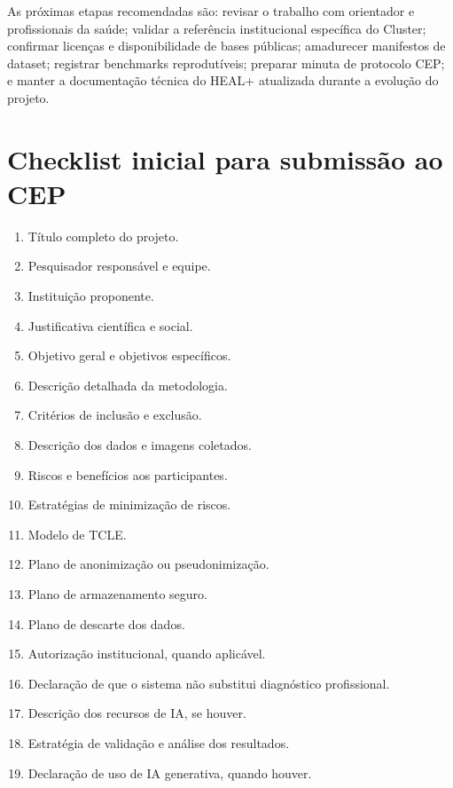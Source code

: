 \documentclass[
    12pt,
    oneside,
    a4paper,
    chapter=TITLE,
    brazil,
    sumario=tradicional,
    hidelinks
]{abntex2}
\begin{document}
As próximas etapas recomendadas são: revisar o trabalho com orientador e profissionais da saúde; validar a referência institucional específica do Cluster; confirmar licenças e disponibilidade de bases públicas; amadurecer manifestos de dataset; registrar benchmarks reprodutíveis; preparar minuta de protocolo CEP; e manter a documentação técnica do HEAL+ atualizada durante a evolução do projeto.

\postextual




\appendix

\chapter{Checklist inicial para submissão ao CEP}

\begin{enumerate}
    \item Título completo do projeto.
    \item Pesquisador responsável e equipe.
    \item Instituição proponente.
    \item Justificativa científica e social.
    \item Objetivo geral e objetivos específicos.
    \item Descrição detalhada da metodologia.
    \item Critérios de inclusão e exclusão.
    \item Descrição dos dados e imagens coletados.
    \item Riscos e benefícios aos participantes.
    \item Estratégias de minimização de riscos.
    \item Modelo de TCLE.
    \item Plano de anonimização ou pseudonimização.
    \item Plano de armazenamento seguro.
    \item Plano de descarte dos dados.
    \item Autorização institucional, quando aplicável.
    \item Declaração de que o sistema não substitui diagnóstico profissional.
    \item Descrição dos recursos de IA, se houver.
    \item Estratégia de validação e análise dos resultados.
    \item Declaração de uso de IA generativa, quando houver.
\end{enumerate}
\end{document}
